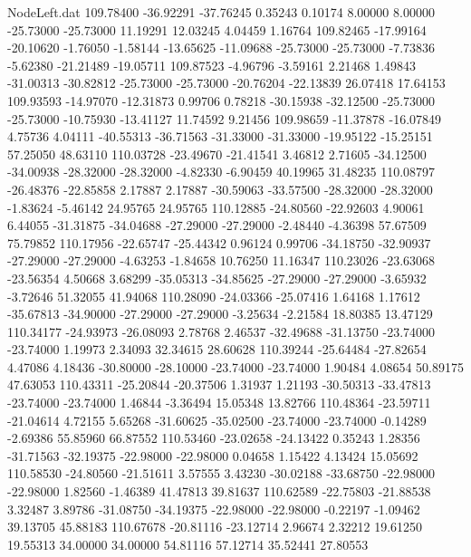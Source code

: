 \begin{filecontents}{NodeLeft.dat}
 109.78400  -36.92291  -37.76245     0.35243    0.10174    8.00000    8.00000  -25.73000  -25.73000   11.19291   12.03245    4.04459    1.16764
 109.82465  -17.99164  -20.10620    -1.76050   -1.58144  -13.65625  -11.09688  -25.73000  -25.73000   -7.73836   -5.62380  -21.21489  -19.05711
 109.87523   -4.96796   -3.59161     2.21468    1.49843  -31.00313  -30.82812  -25.73000  -25.73000  -20.76204  -22.13839   26.07418   17.64153
 109.93593  -14.97070  -12.31873     0.99706    0.78218  -30.15938  -32.12500  -25.73000  -25.73000  -10.75930  -13.41127   11.74592    9.21456
 109.98659  -11.37878  -16.07849     4.75736    4.04111  -40.55313  -36.71563  -31.33000  -31.33000  -19.95122  -15.25151   57.25050   48.63110
 110.03728  -23.49670  -21.41541     3.46812    2.71605  -34.12500  -34.00938  -28.32000  -28.32000   -4.82330   -6.90459   40.19965   31.48235
 110.08797  -26.48376  -22.85858     2.17887    2.17887  -30.59063  -33.57500  -28.32000  -28.32000   -1.83624   -5.46142   24.95765   24.95765
 110.12885  -24.80560  -22.92603     4.90061    6.44055  -31.31875  -34.04688  -27.29000  -27.29000   -2.48440   -4.36398   57.67509   75.79852
 110.17956  -22.65747  -25.44342     0.96124    0.99706  -34.18750  -32.90937  -27.29000  -27.29000   -4.63253   -1.84658   10.76250   11.16347
 110.23026  -23.63068  -23.56354     4.50668    3.68299  -35.05313  -34.85625  -27.29000  -27.29000   -3.65932   -3.72646   51.32055   41.94068
 110.28090  -24.03366  -25.07416     1.64168    1.17612  -35.67813  -34.90000  -27.29000  -27.29000   -3.25634   -2.21584   18.80385   13.47129
 110.34177  -24.93973  -26.08093     2.78768    2.46537  -32.49688  -31.13750  -23.74000  -23.74000    1.19973    2.34093   32.34615   28.60628
 110.39244  -25.64484  -27.82654     4.47086    4.18436  -30.80000  -28.10000  -23.74000  -23.74000    1.90484    4.08654   50.89175   47.63053
 110.43311  -25.20844  -20.37506     1.31937    1.21193  -30.50313  -33.47813  -23.74000  -23.74000    1.46844   -3.36494   15.05348   13.82766
 110.48364  -23.59711  -21.04614     4.72155    5.65268  -31.60625  -35.02500  -23.74000  -23.74000   -0.14289   -2.69386   55.85960   66.87552
 110.53460  -23.02658  -24.13422     0.35243    1.28356  -31.71563  -32.19375  -22.98000  -22.98000    0.04658    1.15422    4.13424   15.05692
 110.58530  -24.80560  -21.51611     3.57555    3.43230  -30.02188  -33.68750  -22.98000  -22.98000    1.82560   -1.46389   41.47813   39.81637
 110.62589  -22.75803  -21.88538     3.32487    3.89786  -31.08750  -34.19375  -22.98000  -22.98000   -0.22197   -1.09462   39.13705   45.88183
 110.67678  -20.81116  -23.12714     2.96674    2.32212   19.61250   19.55313   34.00000   34.00000   54.81116   57.12714   35.52441   27.80553

\end{filecontents}
